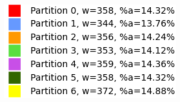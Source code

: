 \begin{figure}[h]
\centering
\begin{subfigure}{.33\textwidth}
    \centering
    \caption[short]{}
\end{subfigure}%
\begin{subfigure}{.33\textwidth}
    \centering
    \caption[short]{}
\end{subfigure}%
\begin{subfigure}{.33\textwidth}
    \centering
    \includegraphics[width=0.9\linewidth]{images/results/m/1/results}

\end{subfigure}
\end{figure}
